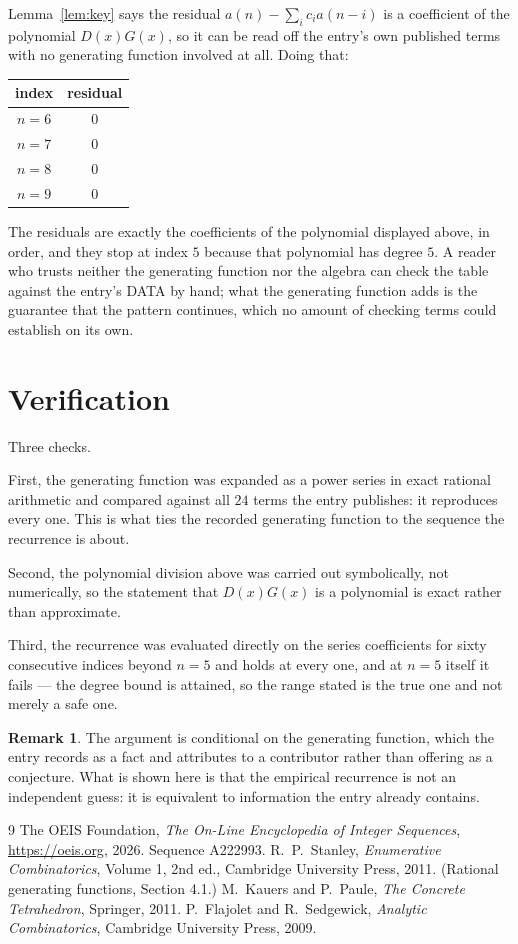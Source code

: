 \documentclass[11pt,a4paper]{article}
\theoremstyle{plain}
\theoremstyle{definition}
\newtheorem{remark}[theorem]{Remark}
\begin{document}
Lemma~\ref{lem:key} says the residual $a(n)-\sum_ic_ia(n-i)$ is a coefficient of the
polynomial $D(x)G(x)$, so it can be read off the entry's own published terms with no
generating function involved at all. Doing that:
\begin{center}
\begin{tabular}{cc}
index & residual \\ \hline
$n=6$ & $0$ \\
$n=7$ & $0$ \\
$n=8$ & $0$ \\
$n=9$ & $0$
\end{tabular}
\end{center}
The residuals are exactly the coefficients of the polynomial displayed above, in order, and
they stop at index $5$ because that polynomial has degree $5$. A reader who trusts
neither the generating function nor the algebra can check the table against the entry's DATA
by hand; what the generating function adds is the guarantee that the pattern continues, which
no amount of checking terms could establish on its own.

\section{Verification}

Three checks.

First, the generating function was expanded as a power series in exact rational arithmetic and
compared against all $24$ terms the entry publishes: it reproduces every one. This is
what ties the recorded generating function to the sequence the recurrence is about.

Second, the polynomial division above was carried out symbolically, not numerically, so the
statement that $D(x)G(x)$ is a polynomial is exact rather than approximate.

Third, the recurrence was evaluated directly on the series coefficients for sixty consecutive
indices beyond $n=5$ and holds at every one, and at $n=5$ itself it fails --- the
degree bound is attained, so the range stated is the true one and not merely a safe one.

\begin{remark}
The argument is conditional on the generating function, which the entry records as a fact and
attributes to a contributor rather than offering as a conjecture. What is shown here is that
the empirical recurrence is not an independent guess: it is equivalent to information the
entry already contains.
\end{remark}

\begin{thebibliography}{9}
 The OEIS Foundation, \emph{The On-Line Encyclopedia of Integer
Sequences}, \url{https://oeis.org}, 2026. Sequence A222993.
 R.~P.~Stanley, \emph{Enumerative Combinatorics}, Volume 1, 2nd ed.,
Cambridge University Press, 2011. (Rational generating functions, Section 4.1.)
 M.~Kauers and P.~Paule, \emph{The Concrete Tetrahedron}, Springer, 2011.
 P.~Flajolet and R.~Sedgewick, \emph{Analytic Combinatorics}, Cambridge
University Press, 2009.
\end{thebibliography}
\end{document}
